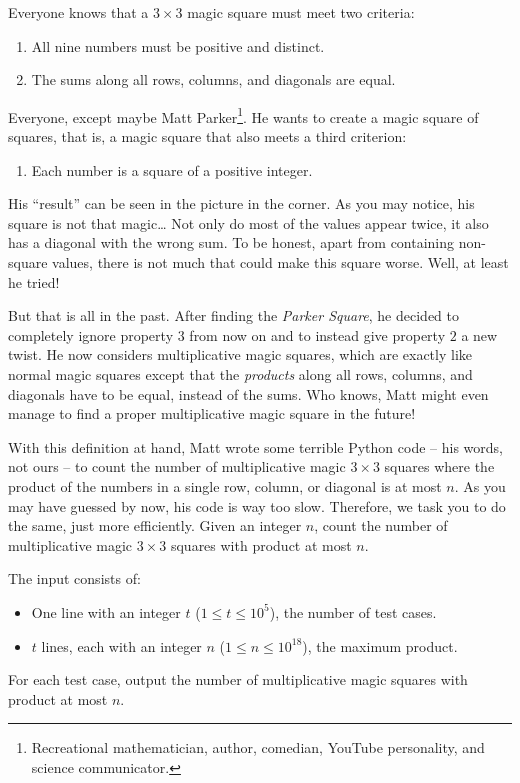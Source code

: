 

Everyone knows that a $3\times3$ magic square must meet two criteria:
\begin{enumerate}
	\item All nine numbers must be positive and distinct.
	\item The sums along all rows, columns, and diagonals are equal.
\end{enumerate}
Everyone, except  maybe Matt Parker\footnote{Recreational mathematician, author, comedian, YouTube personality, and science communicator.}.
He wants to create a magic square of squares, that is, a magic square that also meets a third criterion:
\begin{enumerate}
	\item[3.] Each number is a square of a positive integer.
\end{enumerate}
His ``result'' can be seen in the picture in the corner.
As you may notice, his square is not that magic\dots{}
Not only do most of the values appear twice, it also has a diagonal with the wrong sum.
To be honest, apart from containing non-square values, there is not much that could make this square worse.
Well, at least he tried!

But that is all in the past.
After finding the \emph{Parker Square}, he decided to completely ignore property $3$ from now on and to instead give property $2$ a new twist.
He now considers multiplicative magic squares, which are exactly like normal magic squares except that the \emph{products} along all rows, columns, and diagonals have to be equal, instead of the sums.
Who knows, Matt might even manage to find a proper multiplicative magic square in the future!

With this definition at hand, Matt wrote some terrible Python code -- his words, not ours -- to count the number of multiplicative magic $3\times 3$ squares where the product of the numbers in a single row, column, or diagonal is at most $n$.
As you may have guessed by now, his code is way too slow.
Therefore, we task you to do the same, just more efficiently.
Given an integer $n$, count the number of multiplicative magic $3\times 3$ squares with product at most $n$.

\begin{Input}
	The input consists of:
	\begin{itemize}
		\item One line with an integer $t$ ($1 \leq t \leq 10^5$), the number of test cases.
    \item $t$ lines, each with an integer $n$ ($1 \leq n \leq 10^{18}$), the maximum product.
	\end{itemize}
\end{Input}

\begin{Output}
	For each test case, output the number of multiplicative magic squares with product at most $n$.
\end{Output}
